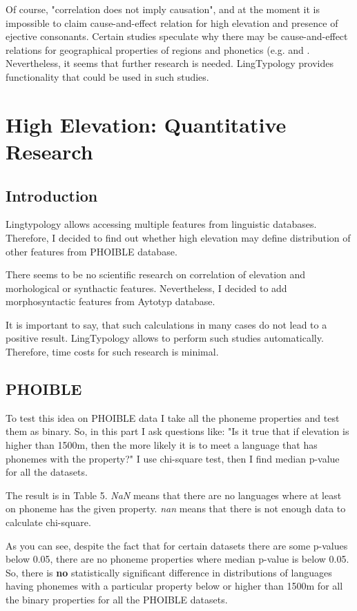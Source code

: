 \documentclass[a4paper,12pt]{article}
\begin{document}
Of course, "correlation does not imply causation", and at the moment it is impossible to claim cause-and-effect relation for high elevation and presence of ejective consonants. Certain studies speculate why there may be cause-and-effect relations for geographical properties of regions and phonetics (e.g. \parencite{ejectives} and \parencite{climatesSonorants}. Nevertheless, it seems that further research is needed. LingTypology provides functionality that could be used in such studies.

\newpage

\section{High Elevation: Quantitative Research}

\subsection{Introduction}
Lingtypology allows accessing multiple features from linguistic databases. Therefore, I decided to find out whether high elevation may define distribution of other features from PHOIBLE database.

There seems to be no scientific research on correlation of elevation and morhological or synthactic features. Nevertheless, I decided to add morphosyntactic features from Aytotyp database.

It is important to say, that such calculations in many cases do not lead to a positive result. LingTypology allows to perform such studies automatically. Therefore, time costs for such research is minimal.

\subsection{PHOIBLE}

To test this idea on PHOIBLE data I take all the phoneme properties and test them as binary. So, in this part I ask questions like: "Is it true that if elevation is higher than 1500m, then the more likely it is to meet a language that has phonemes with the property?" I use chi-square test, then I find median p-value for all the datasets.

The result is in Table 5. \textit{NaN} means that there are no languages where at least on phoneme has the given property. \textit{nan} means that there is not enough data to calculate chi-square.

As you can see, despite the fact that for certain datasets there are some p-values below 0.05, there are no phoneme properties where median p-value is below 0.05. So, there is \textbf{no} statistically significant difference in distributions of languages having phonemes with a particular property below or higher than 1500m for all the binary properties for all the PHOIBLE datasets.
\end{document}
